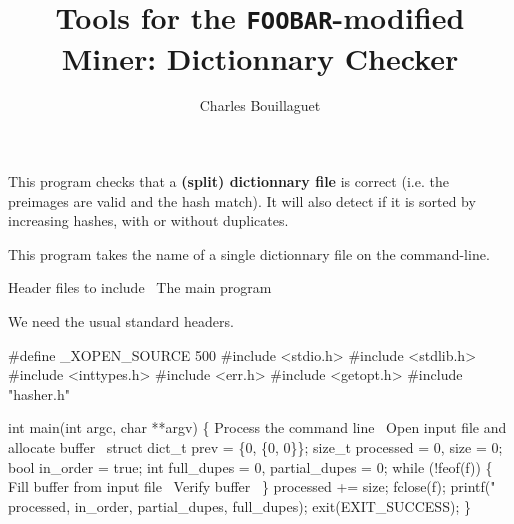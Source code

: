 \documentclass{article}%
\begin{document}
\title{Tools for the \texttt{FOOBAR}-modified Miner: Dictionnary Checker}
\author{Charles Bouillaguet}

\maketitle

This program checks that a \textbf{(split) dictionnary file} is correct (i.e.
the preimages are valid and the hash match). It will also detect if it is
sorted by increasing hashes, with or without duplicates.

This program takes the name of a single dictionnary file on the command-line.

\endmoddef\nwstartdeflinemarkup\nwenddeflinemarkup
\LA{}Header files to include~{\nwtagstyle{}}\RA{}
\LA{}The main program~{\nwtagstyle{}}\RA{}

\nwnotused{*}\nwendcode{}We need the usual standard headers.

\nwenddocs{}\endmoddef\nwstartdeflinemarkup{}\nwenddeflinemarkup
#define _XOPEN_SOURCE 500
#include <stdio.h>
#include <stdlib.h>
#include <inttypes.h>
#include <err.h>
#include <getopt.h>
#include "hasher.h"

\nwendcode{}\endmoddef\nwstartdeflinemarkup{}\nwenddeflinemarkup
int main(int argc, char **argv)
\{
        \LA{}Process the command line~{\nwtagstyle{}}\RA{}
        \LA{}Open input file and allocate \code{}buffer\edoc{}~{\nwtagstyle{}}\RA{}
        struct dict_t prev = \{0, \{0, 0\}\};
        size_t processed = 0, size = 0;
        bool in_order = true;
        int full_dupes = 0, partial_dupes = 0;
        while (!feof(f)) \{
                \LA{}Fill \code{}buffer\edoc{} from input file~{\nwtagstyle{}}\RA{}
                \LA{}Verify \code{}buffer\edoc{}~{\nwtagstyle{}}\RA{}
        \}
        processed += size;
        fclose(f);
        printf("%
                processed, in_order, partial_dupes, full_dupes);
        exit(EXIT_SUCCESS);
\}
\end{document}
